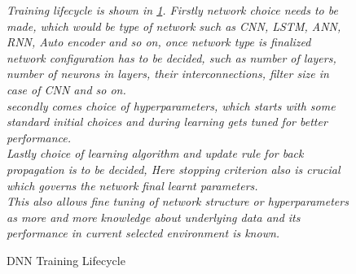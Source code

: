 \begin{figure}[H]
\centering
	\caption{\label{fig:dnn_lifecycle} DNN Training Lifecycle} 
	\medskip
	\small
	\begin{flushleft}
	\textit{Training lifecycle is shown in \ref{fig:dnn_lifecycle}. Firstly network choice needs to be made, which would be type of network such as CNN, LSTM, ANN, RNN, Auto encoder and so on, once network type is finalized network configuration has to be decided, such as number of layers, number of neurons in layers, their interconnections, filter size in case of CNN and so on.\\
	secondly comes choice of hyperparameters, which starts with some standard initial choices and during learning gets tuned for better performance.\\
Lastly choice of learning algorithm and update rule for back propagation is to be decided, Here stopping criterion also is crucial which governs the network final learnt parameters.\\
This also allows fine tuning of network structure or hyperparameters as more and more knowledge about underlying data and its performance in current selected environment is known.}
	\end{flushleft}
		
\end{figure}
